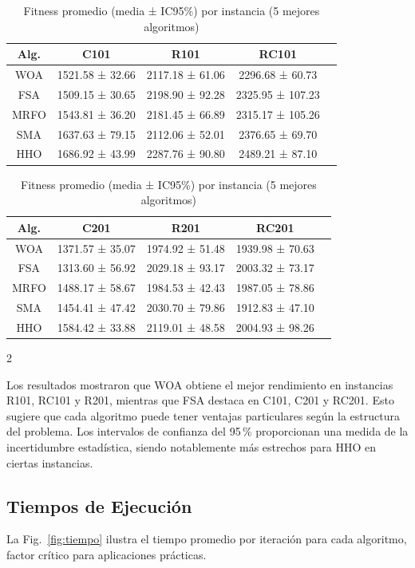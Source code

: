 \documentclass[10pt,a4paper]{extarticle}
\begin{document}
\begin{table}[!htbp]
  \centering
  \caption{Fitness promedio (media ± IC95\%) por instancia (5 mejores algoritmos)}
  \label{tab:fitness}
  \small
  \begin{tabular}{@{}ccccc@{}}
    \toprule
    \textbf{Alg.} & \textbf{C101} & \textbf{R101} & \textbf{RC101} \\
    \midrule
    WOA  & 1521.58 ± 32.66 & 2117.18 ± 61.06 & 2296.68 ± 60.73 \\
    FSA  & 1509.15 ± 30.65 & 2198.90 ± 92.28 & 2325.95 ± 107.23 \\
    MRFO & 1543.81 ± 36.20 & 2181.45 ± 66.89 & 2315.17 ± 105.26 \\
    SMA  & 1637.63 ± 79.15 & 2112.06 ± 52.01 & 2376.65 ± 69.70 \\
    HHO  & 1686.92 ± 43.99 & 2287.76 ± 90.80 & 2489.21 ± 87.10 \\
    \bottomrule
  \end{tabular}

  \vspace{10pt}

  \begin{tabular}{@{}ccccc@{}}
    \toprule
    \textbf{Alg.} & \textbf{C201} & \textbf{R201} & \textbf{RC201} \\
    \midrule
    WOA  & 1371.57 ± 35.07 & 1974.92 ± 51.48 & 1939.98 ± 70.63 \\
    FSA  & 1313.60 ± 56.92 & 2029.18 ± 93.17 & 2003.32 ± 73.17 \\
    MRFO & 1488.17 ± 58.67 & 1984.53 ± 42.43 & 1987.05 ± 78.86 \\
    SMA  & 1454.41 ± 47.42 & 2030.70 ± 79.86 & 1912.83 ± 47.10 \\
    HHO  & 1584.42 ± 33.88 & 2119.01 ± 48.58 & 2004.93 ± 98.26 \\
    \bottomrule
  \end{tabular}
\end{table}

\begin{multicols}{2}

Los resultados mostraron que WOA obtiene el mejor rendimiento en instancias R101, RC101 y R201, mientras que FSA destaca en C101, C201 y RC201. Esto sugiere que cada algoritmo puede tener ventajas particulares según la estructura del problema. Los intervalos de confianza del 95\,\% proporcionan una medida de la incertidumbre estadística, siendo notablemente más estrechos para HHO en ciertas instancias.

\subsection{Tiempos de Ejecución}
La Fig.~\ref{fig:tiempo} ilustra el tiempo promedio por iteración para cada algoritmo, factor crítico para aplicaciones prácticas.

\end{multicols}
\end{document}
